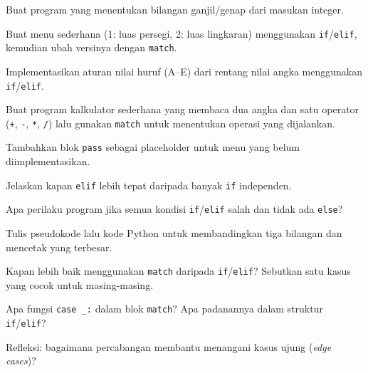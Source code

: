﻿\documentclass[../main.tex]{subfiles}
\begin{document}
\begin{aktivitas}
  \item Buat program yang menentukan bilangan ganjil/genap dari masukan integer.
  \item Buat menu sederhana (1: luas persegi, 2: luas lingkaran) menggunakan \texttt{if}/\texttt{elif}, kemudian ubah versinya dengan \texttt{match}.
  \item Implementasikan aturan nilai huruf (A--E) dari rentang nilai angka menggunakan \texttt{if}/\texttt{elif}.
  \item Buat program kalkulator sederhana yang membaca dua angka dan satu operator (\texttt{+}, \texttt{-}, \texttt{*}, \texttt{/}) lalu gunakan \texttt{match} untuk menentukan operasi yang dijalankan.
  \item Tambahkan blok \texttt{pass} sebagai placeholder untuk menu yang belum diimplementasikan.
\end{aktivitas}

\begin{latihan}
  \item Jelaskan kapan \texttt{elif} lebih tepat daripada banyak \texttt{if} independen.
  \item Apa perilaku program jika semua kondisi \texttt{if}/\texttt{elif} salah dan tidak ada \texttt{else}?
  \item Tulis pseudokode lalu kode Python untuk membandingkan tiga bilangan dan mencetak yang terbesar.
  \item Kapan lebih baik menggunakan \texttt{match} daripada \texttt{if}/\texttt{elif}? Sebutkan satu kasus yang cocok untuk masing-masing.
  \item Apa fungsi \texttt{case \_:} dalam blok \texttt{match}? Apa padanannya dalam struktur \texttt{if}/\texttt{elif}?
  \item Refleksi: bagaimana percabangan membantu menangani kasus ujung (\textit{edge cases})?
\end{latihan}
\end{document}
